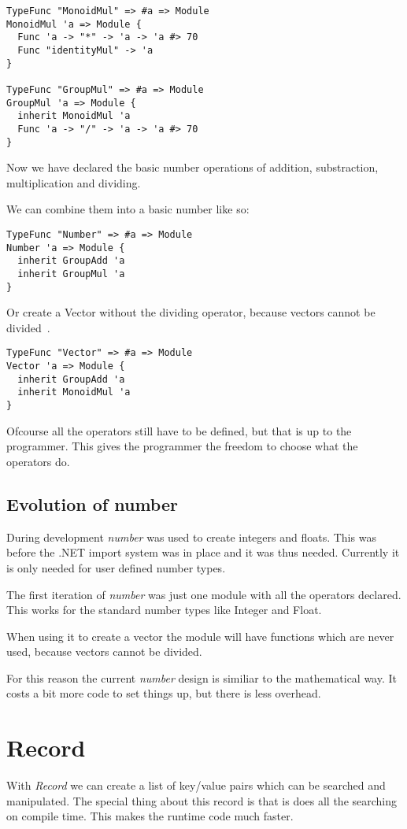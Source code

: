\begin{lstlisting}
TypeFunc "MonoidMul" => #a => Module
MonoidMul 'a => Module {
  Func 'a -> "*" -> 'a -> 'a #> 70
  Func "identityMul" -> 'a
}

TypeFunc "GroupMul" => #a => Module
GroupMul 'a => Module {
  inherit MonoidMul 'a
  Func 'a -> "/" -> 'a -> 'a #> 70
}
\end{lstlisting}

Now we have declared the basic number operations of addition, substraction, multiplication and dividing.

We can combine them into a basic number like so:

\begin{lstlisting}
TypeFunc "Number" => #a => Module
Number 'a => Module {
  inherit GroupAdd 'a
  inherit GroupMul 'a
}
\end{lstlisting}

Or create a Vector without the dividing operator, because vectors cannot be divided~\cite{}.

\begin{lstlisting}
TypeFunc "Vector" => #a => Module
Vector 'a => Module {
  inherit GroupAdd 'a
  inherit MonoidMul 'a
}
\end{lstlisting}

Ofcourse all the operators still have to be defined, but that is up to the programmer.
This gives the programmer the freedom to choose what the operators do.


\subsection{Evolution of number}
During development \emph{number} was used to create integers and floats.
This was before the .NET import system was in place and it was thus needed.
Currently it is only needed for user defined number types.

The first iteration of \emph{number} was just one module with all the operators declared.
This works for the standard number types like Integer and Float.

When using it to create a vector the module will have functions which are never used, because vectors cannot be divided.

For this reason the current \emph{number} design is similiar to the mathematical way.
It costs a bit more code to set things up, but there is less overhead.


\section{Record}
With \emph{Record} we can create a list of key/value pairs which can be searched and manipulated.
The special thing about this record is that is does all the searching on compile time.
This makes the runtime code much faster.


